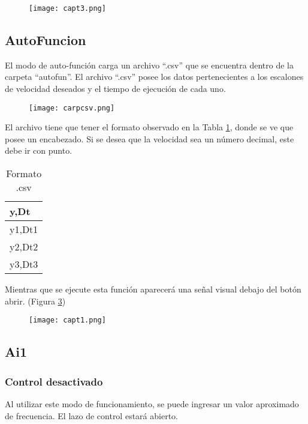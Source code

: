 \begin{figure}[H]
	\centering
	\texttt{[image: capt3.png]}
	\label{fig:capt3}
\end{figure}

\subsection{AutoFuncion}
El modo de auto-función carga un archivo “.csv” que se encuentra dentro de la carpeta “autofun”. El archivo “.csv” posee los datos pertenecientes a los escalones de velocidad deseados y el tiempo de ejecución de cada uno.

\begin{figure}[htb]
	\centering
	\texttt{[image: carpcsv.png]}
	\label{fig:autof2}
\end{figure}


El archivo tiene que tener el formato observado en la Tabla \ref{tab:formcsv}, donde se ve que posee un encabezado. Si se desea que la velocidad sea un número decimal, este debe ir con punto. 
\begin{table}[h]
	\centering
	\begin{tabular}{|l|}
		\hline
		y,Dt \\ \hline
		y1,Dt1 \\ \hline
		y2,Dt2 \\ \hline
		y3,Dt3 \\ \hline
	\end{tabular}
	
	\caption{Formato .csv}
	\label{tab:formcsv}
\end{table}

Mientras que se ejecute esta función aparecerá una señal visual debajo del botón abrir. (Figura \ref{fig:autof1})

\begin{figure}[htb]
	\centering
	\texttt{[image: capt1.png]}
	\label{fig:autof1}
\end{figure}



\subsection{Ai1}
\subsubsection{Control desactivado}
Al utilizar este modo de funcionamiento, se puede ingresar un valor aproximado de frecuencia. El lazo de control estará abierto.

